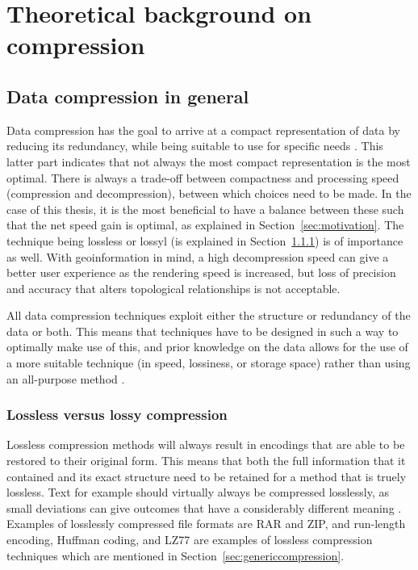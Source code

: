 \chapter{Theoretical background on compression}
\label{ch:theory}

\section{Data compression in general}
\label{sec:datacompression}
Data compression has the goal to arrive at a compact representation of data by reducing its redundancy, while being suitable to use for specific needs \citep{sayood2017introduction}.
This latter part indicates that not always the most compact representation is the most optimal.
There is always a trade-off between compactness and processing speed (compression and decompression), between which choices need to be made.
In the case of this thesis, it is the most beneficial to have a balance between these such that the net speed gain is optimal, as explained in Section~\ref{sec:motivation}.
The technique being lossless or lossyl (is explained in Section~\ref{sec:loss}) is of importance as well.
With geoinformation in mind, a high decompression speed can give a better user experience as the rendering speed is increased, but loss of precision and accuracy that alters topological relationships is not acceptable.


All data compression techniques exploit either the structure or redundancy of the data or both.
This means that techniques have to be designed in such a way to optimally make use of this, and prior knowledge on the data allows for the use of a more suitable technique (in speed, lossiness, or storage space) rather than using an all-purpose method \citep{sayood2017introduction}.

\subsection{Lossless versus lossy compression}
\label{sec:loss}
Lossless compression methods will always result in encodings that are able to be restored to their original form.
This means that both the full information that it contained and its exact structure need to be retained for a method that is truely lossless.
Text for example should virtually always be compressed losslessly, as small deviations can give outcomes that have a considerably different meaning \citep{sayood2017introduction}.
Examples of losslessly compressed file formats are RAR and ZIP, and run-length encoding, Huffman coding, and LZ77 are examples of lossless compression techniques which are mentioned in Section~\ref{sec:genericcompression}.

